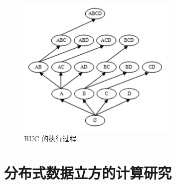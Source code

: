 \begin{figure}[!htb]
\centering\includegraphics[width=3in]{picture/ch_current_research/BUC_execution} 
\caption{BUC 的执行过程}\label{BUC_execution} 
\end{figure} 





\section{分布式数据立方的计算研究}

